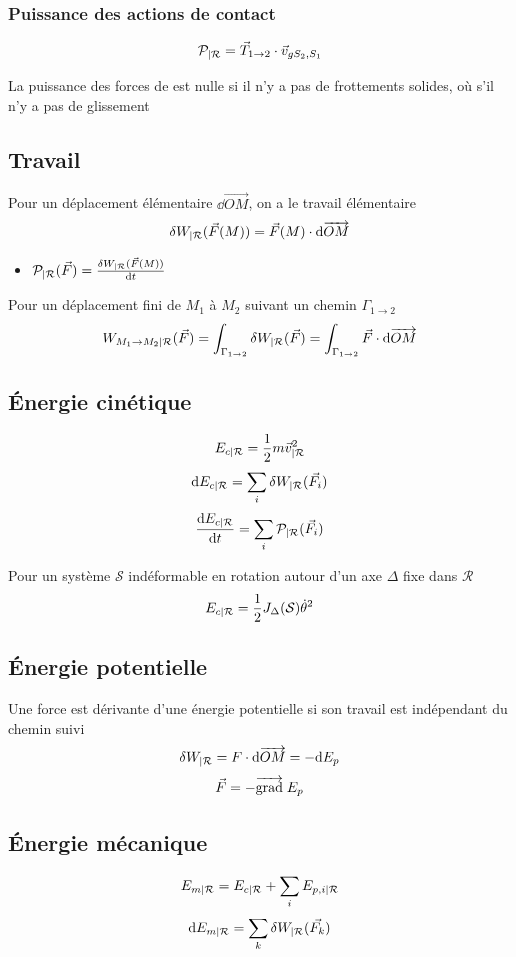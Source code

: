 \documentclass[openany]{book}
\begin{document}
\subsubsection{Puissance des actions de contact}
\[ \mathcal{P}_{|\mathcal{R}} = \vec{T}_{1\rightarrow2} \cdot \vec{v}_{g S_2, S_1} \]

La puissance des forces de est nulle si il n'y a pas de frottements solides, où s'il n'y a pas de glissement

\subsection{Travail}
Pour un déplacement élémentaire $\dd \overrightarrow{OM}$, on a le travail élémentaire
\[ \delta W_{|\mathcal{R}}(\vec{F}(M)) = \vec{F}(M) \cdot \text{d} \overrightarrow{OM} \]
\begin{itemize}
    \item $ \mathcal{P}_{|\mathcal{R}}(\vec{F}) = \frac{\delta W_{|\mathcal{R}}(\vec{F}(M))}{\text{d}t} $
\end{itemize}

Pour un déplacement fini de $M_1$ à $M_2$ suivant un chemin $\Gamma_{1 \rightarrow 2}$
\[ W_{M_1 \rightarrow M_2 |\mathcal{R}}(\vec{F}) = \int_{\Gamma_{1 \rightarrow 2}}  \delta W_{|\mathcal{R}}(\vec{F}) = \int_{\Gamma_{1 \rightarrow 2}}  \vec{F} \cdot \text{d} \overrightarrow{OM} \]

\subsection{Énergie cinétique}
\[ E_{c |\mathcal{R}} = \frac{1}{2} m \vec{v}_{|\mathcal{R}}^2 \]
\[ \text{d} E_{c |\mathcal{R}} = \sum_i \delta W_{|\mathcal{R}}(\vec{F_i}) \]
\[ \frac{\text{d} E_{c |\mathcal{R}}}{\text{d}t} = \sum_i \mathcal{P}_{|\mathcal{R}}(\vec{F_i}) \]

\noindent Pour un système $\mathcal{S}$ indéformable en rotation autour d'un axe $\Delta$ fixe dans $\mathcal{R}$
\[ E_{c |\mathcal{R}} = \frac{1}{2} J_{\Delta}(\mathcal{S}) \dot{\theta}^2 \]

\subsection{Énergie potentielle}
Une force est dérivante d'une énergie potentielle si son travail est indépendant du chemin suivi
\[ \delta W_{|\mathcal{R}} = F \cdot \text{d} \overrightarrow{OM} = -\text{d} E_p \]
\[ \vec{F} = - \overrightarrow{{\text{grad}}} \; E_p \]

\subsection{Énergie mécanique}
\[ E_{m|\mathcal{R}} = E_{c|\mathcal{R}} + \sum_i E_{p, i |\mathcal{R}} \]
\[ \text{d} E_{m|\mathcal{R}} = \sum_k \delta W_{|\mathcal{R}}(\vec{F_k}) \]
\end{document}
